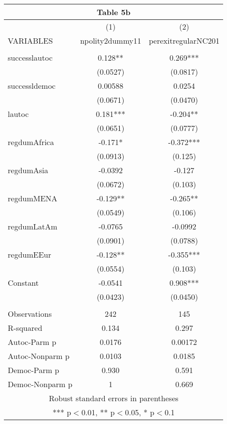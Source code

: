 \documentclass[]{article}
\begin{document}
\begin{tabular}{lcc}
\multicolumn{3}{c}{Table 5b} \\ \hline
 & (1) & (2) \\
VARIABLES & npolity2dummy11 & perexitregularNC201 \\ \hline
 &  &  \\
successlautoc & 0.128** & 0.269*** \\
 & (0.0527) & (0.0817) \\
successldemoc & 0.00588 & 0.0254 \\
 & (0.0671) & (0.0470) \\
lautoc & 0.181*** & -0.204** \\
 & (0.0651) & (0.0777) \\
regdumAfrica & -0.171* & -0.372*** \\
 & (0.0913) & (0.125) \\
regdumAsia & -0.0392 & -0.127 \\
 & (0.0672) & (0.103) \\
regdumMENA & -0.129** & -0.265** \\
 & (0.0549) & (0.106) \\
regdumLatAm & -0.0765 & -0.0992 \\
 & (0.0901) & (0.0788) \\
regdumEEur & -0.128** & -0.355*** \\
 & (0.0554) & (0.103) \\
Constant & -0.0541 & 0.908*** \\
 & (0.0423) & (0.0450) \\
 &  &  \\
Observations & 242 & 145 \\
R-squared & 0.134 & 0.297 \\
Autoc-Parm p & 0.0176 & 0.00172 \\
Autoc-Nonparm p & 0.0103 & 0.0185 \\
Democ-Parm p & 0.930 & 0.591 \\
 Democ-Nonparm p & 1 & 0.669 \\ \hline
\multicolumn{3}{c}{ Robust standard errors in parentheses} \\
\multicolumn{3}{c}{ *** p$<$0.01, ** p$<$0.05, * p$<$0.1} \\
\end{tabular}
\end{document}
